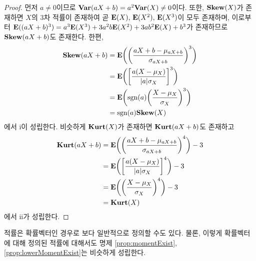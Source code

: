 \begin{proof}
    먼저 $a\ne0$이므로 $\mathbf{Var}(aX+b)=a^2\mathbf{Var}(X)\ne0$이다. 또한, $\mathbf{Skew}(X)$가 존재하면 $X$의 $3$차 적률이 존재하여 곧 $\mathbf{E}(X),\,\mathbf{E}(X^2),\,\mathbf{E}(X^3)$이 모두 존재하며, 이로부터 $\mathbf{E}((aX+b)^3)=a^3\mathbf{E}(X^3)+3a^2b\mathbf{E}(X^2)+3ab^2\mathbf{E}(X)+b^3$가 존재하므로 $\mathbf{Skew}(aX+b)$도 존재한다. 한편,
    \begin{align*}
        \mathbf{Skew}(aX+b)&=\mathbf{E}\bigg(\bigg(\frac{aX+b-\mu_{aX+b}}{\sigma_{aX+b}}\bigg)^3\bigg)\\
        &=\mathbf{E}\bigg(\bigg[\frac{a(X-\mu_X)}{|a|\sigma_X}\bigg]^3\bigg)\\
        &=\mathbf{E}\bigg(\mathrm{sgn}(a)\bigg(\frac{X-\mu_X}{\sigma_X}\bigg)^3\bigg)\\
        &=\mathrm{sgn}(a)\mathbf{Skew}(X)
    \end{align*}
    에서 i이 성립한다. 비슷하게 $\mathbf{Kurt}(X)$가 존재하면 $\mathbf{Kurt}(aX+b)$도 존재하고
    \begin{align*}
        \mathbf{Kurt}(aX+b)&=\mathbf{E}\bigg(\bigg(\frac{aX+b-\mu_{aX+b}}{\sigma_{aX+b}}\bigg)^4\bigg)-3\\
        &=\mathbf{E}\bigg(\bigg[\frac{a(X-\mu_X)}{|a|\sigma_X}\bigg]^4\bigg)-3\\
        &=\mathbf{E}\bigg(\bigg(\frac{X-\mu_X}{\sigma_X}\bigg)^4\bigg)-3\\
        &=\mathbf{Kurt}(X)
    \end{align*}
    에서 ii가 성립한다.
\end{proof}

적률은 확률벡터인 경우로 보다 일반적으로 정의할 수도 있다. 물론, 이렇게 확률벡터에 대해 정의된 적률에 대해서도 명제 \ref{prop:momentExist}, \ref{prop:lowerMomentExist}는 비슷하게 성립한다.

